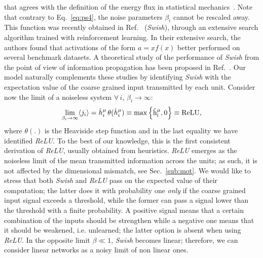 \documentclass{article}
\begin{document}
%
that agrees with the definition of the energy flux in statistical mechanics~\cite{bellac}. Note that contrary to Eq.~\eqref{eq:ps4}, the noise parameters $\beta_i$ cannot be rescaled away. This function was recently obtained in Ref.~\cite{prajit} ({\it Swish}), through an extensive search algorithm trained with reinforcement learning. In their extensive search, the authors found that activations of the form $a = x f(x)$  better performed on several benchmark datasets. A theoretical study of the performance of {\it Swish} from the point of view of information propagation has been proposed in Ref.~\cite{soufiane}.  Our model naturally complements these studies by identifying {\it Swish} with the expectation value of the coarse grained input transmitted by each unit. Consider now the limit of a noiseless system $\forall \, i$, $\beta_i \to \infty $:
%
\begin{equation} \label{eq:ps6}
\lim_{\beta_i \to \infty } \langle j_i \rangle =  \hat{h}^{\mu}_i \, \theta(\hat{h}^{\mu}_i)  \equiv   \rm{max} \left\{ \hat{h}^{\mu}_i, 0\right\} \equiv ReLU,
\end{equation}
%
where $\theta(.)$ is the Heaviside step function and in the last equality we have identified {\it ReLU}. To the best of our knowledge, this is the first consistent derivation of {\it ReLU}, usually obtained from heuristics. {\it ReLU} emerges as the noiseless limit of the mean transmitted information across the units; as such, it is not affected by the dimensional mismatch, see Sec.~\eqref{sub:mot}. We would like to stress that both {\it Swish} and {\it ReLU} pass on the expected value of their computation; the latter does it with probability one {\it only} if the coarse grained input signal exceeds a threshold, while the former can pass a signal lower than the threshold with a finite probability. A positive signal means that a certain combination of the inputs should be strengthen while a negative one means that it should be weakened, i.e. unlearned; the latter option is absent when using {\it ReLU}. In the opposite limit $\beta \ll 1$, {\it Swish} becomes linear; therefore, we can consider linear networks as a noisy limit of non linear ones.
%
\end{document}

